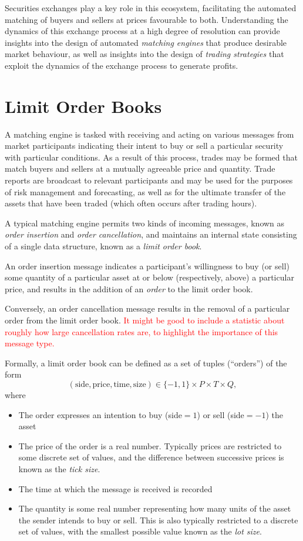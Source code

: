 \documentclass[honours,12pt]{unswthesis}
\numberwithin{equation}{section}
\begin{document}
Securities exchanges play a key role in this ecosystem, facilitating the automated matching of buyers and sellers at prices favourable to both. Understanding the dynamics of this exchange process at a high degree of resolution can provide insights into the design of automated \textit{matching engines} that produce desirable market behaviour, as well as insights into the design of \textit{trading strategies} that exploit the dynamics of the exchange process to generate profits.

\section{Limit Order Books}
A matching engine is tasked with receiving and acting on various messages from market participants indicating their intent to buy or sell a particular security with particular conditions. As a result of this process, trades may be formed that match buyers and sellers at a mutually agreeable price and quantity. Trade reports are broadcast to relevant participants and may be used for the purposes of risk management and forecasting, as well as for the ultimate transfer of the assets that have been traded (which often occurs after trading hours).

\bigskip

A typical matching engine permits two kinds of incoming messages, known as \textit{order insertion} and \textit{order cancellation}, and maintains an internal state consisting of a single data structure, known as a \textit{limit order book}.

\medskip

An order insertion message indicates a participant's willingness to buy (or sell) some quantity of a particular asset at or below (respectively, above) a particular price, and results in the addition of an \textit{order} to the limit order book.

Conversely, an order cancellation message results in the removal of a particular order from the limit order book. \textcolor{red}{It might be good to include a statistic about roughly how large cancellation rates are, to highlight the importance of this message type.}

Formally, a limit order book can be defined as a set of tuples (``orders'') of the form
$$(\text{side},\text{price},\text{time},\text{size})\in \{-1,1\}\times P\times T\times Q,$$
where
\begin{itemize}
	\item The order expresses an intention to buy (side$=1$) or sell (side$=-1$) the asset
	\item The price of the order is a real number. Typically prices are restricted to some discrete set of values, and the difference between successive prices is known as the \textit{tick size}.
	\item The time at which the message is received is recorded
	\item The quantity is some real number representing how many units of the asset the sender intends to buy or sell. This is also typically restricted to a discrete set of values, with the smallest possible value known as the \textit{lot size}.
\end{itemize}
\end{document}
